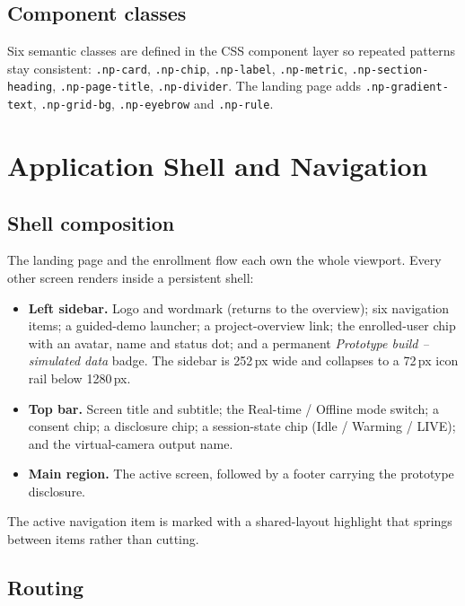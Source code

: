\documentclass[11pt,a4paper]{report}
\newcommand{\code}[1]{\texttt{\small #1}}
\begin{document}
\section{Component classes}

Six semantic classes are defined in the CSS component layer so repeated
patterns stay consistent: \code{.np-card}, \code{.np-chip}, \code{.np-label},
\code{.np-metric}, \code{.np-section-heading}, \code{.np-page-title},
\code{.np-divider}. The landing page adds \code{.np-gradient-text},
\code{.np-grid-bg}, \code{.np-eyebrow} and \code{.np-rule}.

\chapter{Application Shell and Navigation}

\section{Shell composition}

The landing page and the enrollment flow each own the whole viewport. Every
other screen renders inside a persistent shell:

\begin{itemize}
  \item \textbf{Left sidebar.} Logo and wordmark (returns to the overview);
    six navigation items; a guided-demo launcher; a project-overview link; the
    enrolled-user chip with an avatar, name and status dot; and a permanent
    \emph{Prototype build -- simulated data} badge. The sidebar is 252\,px wide
    and collapses to a 72\,px icon rail below 1280\,px.
  \item \textbf{Top bar.} Screen title and subtitle; the Real-time / Offline
    mode switch; a consent chip; a disclosure chip; a session-state chip
    (Idle / Warming / LIVE); and the virtual-camera output name.
  \item \textbf{Main region.} The active screen, followed by a footer carrying
    the prototype disclosure.
\end{itemize}

The active navigation item is marked with a shared-layout highlight that
springs between items rather than cutting.

\section{Routing}
\end{document}
